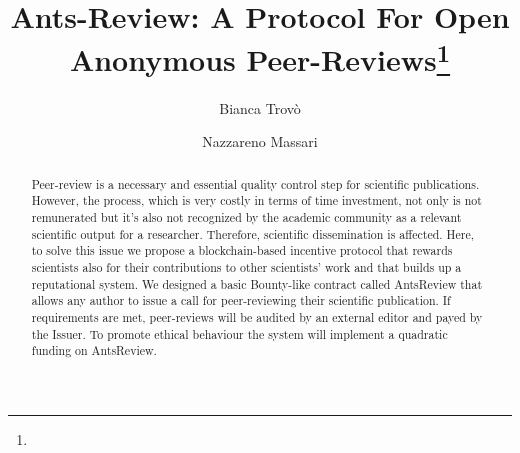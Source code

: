 \documentclass[runningheads]{llncs}
\begin{document}
%
\title{Ants-Review: A Protocol For Open Anonymous Peer-Reviews\thanks{}}
%
%
\author{Bianca Trovò \and
Nazzareno Massari}
%
%
%
\maketitle              %
%
\begin{abstract}
Peer-review is a necessary and essential quality control step for scientific publications. However, the process, which is very costly in terms of time investment, not only is not remunerated but it’s also not recognized by the academic community as a relevant scientific output for a researcher. Therefore, scientific dissemination is affected. Here, to solve this issue we propose a blockchain-based incentive protocol that rewards scientists also for their contributions to other scientists’ work and that builds up a reputational system. We designed a basic Bounty-like contract called AntsReview that allows any author to issue a call for peer-reviewing their scientific publication. If requirements are met, peer-reviews will be audited by an external editor and payed by the Issuer. To promote ethical behaviour the system will implement a quadratic funding on AntsReview.
\end{abstract}
%
%
\end{document}
